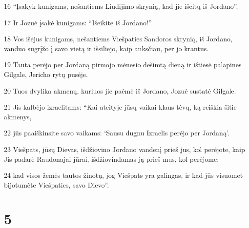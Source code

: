 \par 16 “Įsakyk kunigams, nešantiems Liudijimo skrynią, kad jie išeitų iš Jordano”. 
\par 17 Ir Jozuė įsakė kunigams: “Išeikite iš Jordano!” 
\par 18 Vos išėjus kunigams, nešantiems Viešpaties Sandoros skrynią, iš Jordano, vanduo sugrįžo į savo vietą ir išsiliejo, kaip anksčiau, per jo krantus. 
\par 19 Tauta perėjo per Jordaną pirmojo mėnesio dešimtą dieną ir ištiesė palapines Gilgale, Jericho rytų pusėje. 
\par 20 Tuos dvylika akmenų, kuriuos jie paėmė iš Jordano, Jozuė sustatė Gilgale. 
\par 21 Jis kalbėjo izraelitams: “Kai ateityje jūsų vaikai klaus tėvų, ką reiškia šitie akmenys, 
\par 22 jūs paaiškinsite savo vaikams: ‘Sausu dugnu Izraelis perėjo per Jordaną’. 
\par 23 Viešpats, jūsų Dievas, išdžiovino Jordano vandenį prieš jus, kol perėjote, kaip Jis padarė Raudonajai jūrai, išdžiovindamas ją prieš mus, kol perėjome; 
\par 24 kad visos žemės tautos žinotų, jog Viešpats yra galingas, ir kad jūs visuomet bijotumėte Viešpaties, savo Dievo”.



\chapter{5}


